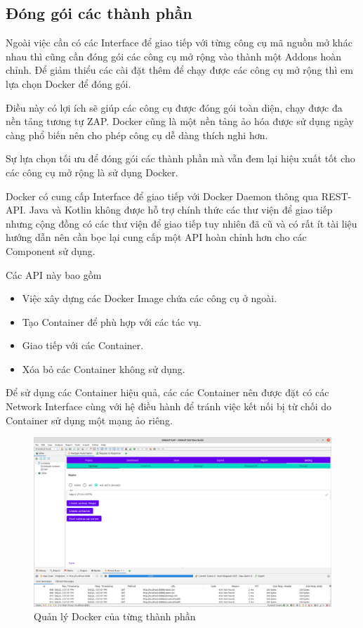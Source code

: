 \documentclass[./../main.tex]{subfiles}
\begin{document}
\subsection{Đóng gói các thành phần}

Ngoài việc cần có các Interface để giao tiếp với từng công cụ mã nguồn
mở khác nhau thì cũng cần đóng gói các công cụ mở rộng vào thành một
Addons hoàn chỉnh. Để giảm thiểu các cài đặt thêm để chạy được các công
cụ mở rộng thì em lựa chọn Docker để đóng gói.

Điều này có lợi ích sẽ giúp các công cụ được đóng gói toàn diện, chạy
được đa nền tảng tương tự ZAP. Docker cũng là một nền tảng ảo hóa được
sử dụng ngày càng phổ biến nên cho phép công cụ dễ dàng thích nghi hơn.

Sự lựa chọn tối ưu để đóng gói các thành phần mà vẫn đem lại hiệu xuất
tốt cho các công cụ mở rộng là sử dụng Docker.

Docker có cung cấp Interface để giao tiếp với Docker Daemon thông qua
REST-API. Java và Kotlin không được hỗ trợ chính thức các thư viện để
giao tiếp nhưng cộng đồng có các thư viện để giao tiếp tuy nhiên đã cũ
và có rất ít tài liệu hướng dẫn nên cần bọc lại cung cấp một API hoàn
chỉnh hơn cho các Component sử dụng.

Các API này bao gồm
\begin{itemize}
	\item Việc xây dựng các Docker Image chứa các công cụ ở ngoài.
	\item Tạo Container để phù hợp với các tác vụ.
	\item Giao tiếp với các Container.
	\item Xóa bỏ các Container không sử dụng.
\end{itemize}

Để sử dụng các Container hiệu quả, các các Container nên được đặt
có các Network Interface cùng với hệ điều hành để tránh việc kết nối
bị từ chối do Container sử dụng một mạng ảo riêng.

\begin{figure}[H]
	\includegraphics[width=\linewidth]{./images/docker.png}
	\caption{Quản lý Docker của từng thành phần}
	\label{fig:docker}
\end{figure}
\end{document}
